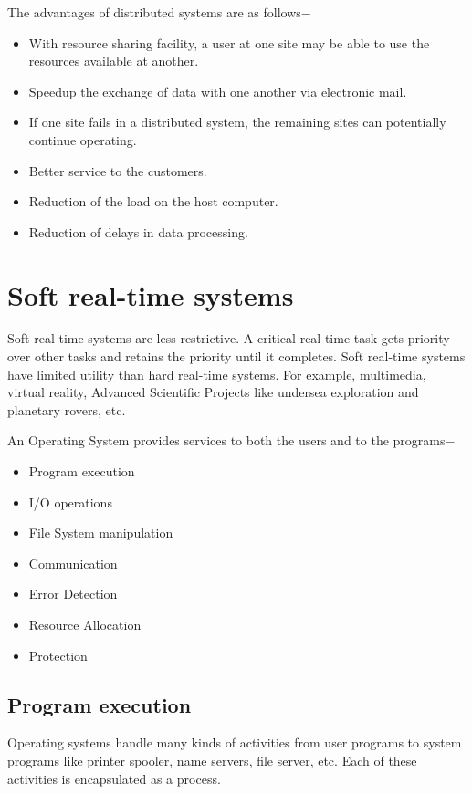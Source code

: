 \documentclass[a4paper,10pt]{article}
\begin{document}
The advantages of distributed systems are as follows$-$
  \begin{itemize}
     \item With resource sharing facility, a user at one site may be able to use the resources available at another.
     \item Speedup the exchange of data with one another via electronic mail.
     \item If one site fails in a distributed system, the remaining sites can potentially continue operating.
     \item Better service to the customers.
     \item Reduction of the load on the host computer.
     \item Reduction of delays in data processing.
  \end{itemize} 
  \newpage
  \section{Soft real-time systems}
  Soft real-time systems are less restrictive. A critical real-time task gets priority over other tasks and retains the priority until it completes. Soft real-time systems have limited utility than hard real-time systems. For example, multimedia, virtual reality, Advanced Scientific Projects like undersea exploration and planetary rovers, etc.
  
  An Operating System provides services to both the users and to the programs$-$
  \begin{itemize}
    \item Program execution
    \item I/O operations
    \item File System manipulation
    \item Communication
    \item Error Detection
    \item Resource Allocation
    \item Protection
 \end{itemize}  
 \subsection{Program execution}
 Operating systems handle many kinds of activities from user programs to system programs like printer spooler, name servers, file server, etc. Each of these activities is encapsulated as a process.
\end{document}
